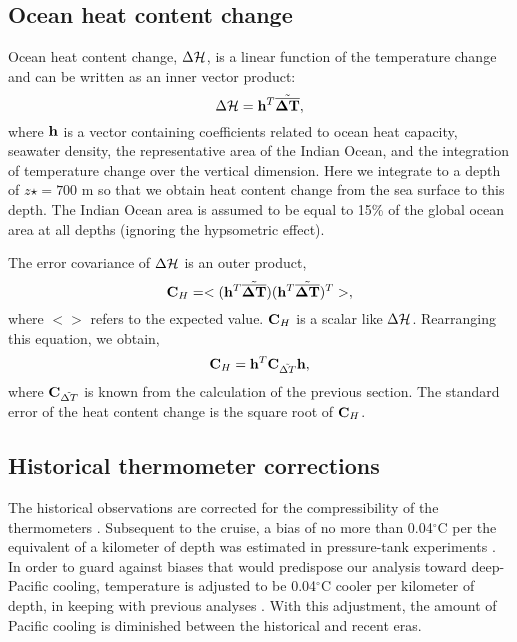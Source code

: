 \documentclass[12pt]{article}
\begin{document}
\subsection{Ocean heat content change}

Ocean heat content change, $\Delta {\cal H}$, is a linear function of
the temperature change and can be written as an inner vector product:
\begin{equation}
\Delta {\cal H} = {\bf h}^T \tilde{\overline{{\boldsymbol \Delta}{\bf T}}},
\end{equation}
where ${\bf h}$ is a vector containing coefficients related to ocean
heat capacity, seawater density, the representative area of the Indian
Ocean, and the integration of temperature change over the vertical
dimension. Here we integrate to a depth of $z\star = 700$ m so that we
obtain heat content change from the sea surface to this depth. The
Indian Ocean area is assumed to be equal to 15\% of the global ocean
area at all depths (ignoring the hypsometric effect).
  
The error covariance of $\Delta {\cal H}$ is an outer product, 
\begin{equation}
\mbox{{\bf C}}_{H} = <({\bf h}^T \tilde{\overline{{\boldsymbol \Delta}{\bf T}}})({\bf h}^T \tilde{\overline{{\boldsymbol \Delta}{\bf T}}})^T>,
\end{equation}
where $<>$ refers to the expected value. ${\bf C}_H$ is a scalar like $\Delta {\cal H}$.
Rearranging this equation, we obtain, 
\begin{equation}
\mbox{{\bf C}}_{H} =  {\bf h}^T \mbox{{\bf C}}_{{\tilde{\Delta T}}} {\bf h},
\end{equation}
where $\mbox{{\bf C}}_{{\tilde{\Delta T}}}$ is known from the
calculation of the previous section. The standard error of the heat
content change is the square root of $\mbox{{\bf C}}_{H}$.

\subsection{Historical thermometer corrections}

The historical observations are corrected for the
compressibility of the thermometers \cite{Tait--1882:Pressure}.
Subsequent to the cruise, a bias of no more than 0.04$^\circ$C per the
equivalent of a kilometer of depth was estimated in pressure-tank
experiments \cite{Tait--1882:Pressure}. In order to guard against
biases that would predispose our analysis toward deep-Pacific cooling,
temperature is adjusted to be 0.04$^\circ$C cooler per kilometer of
depth, in keeping with previous analyses
\cite{Roemmich-Gould-2012:135}. With this adjustment, the amount of
Pacific cooling is diminished between the historical and recent eras.
\end{document}

